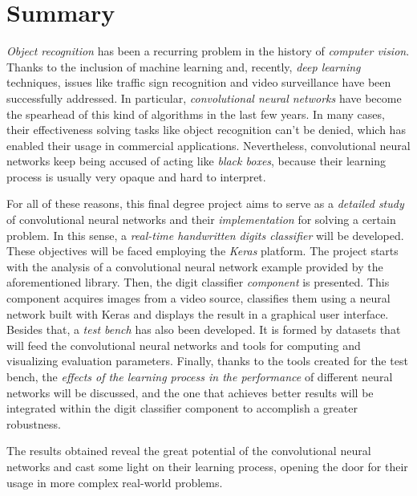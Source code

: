 \chapter*{Summary}
\emph{Object recognition} has been a recurring problem in the history of \emph{computer vision}. Thanks to the inclusion of machine learning and, recently, \emph{deep learning} techniques, issues like traffic sign recognition and video surveillance have been successfully addressed. In particular, \emph{convolutional neural networks} have become the spearhead of this kind of algorithms in the last few years. In many cases, their effectiveness solving tasks like object recognition can't be denied, which has enabled their usage in commercial applications. Nevertheless, convolutional neural networks keep being accused of acting like \emph{black boxes}, because their learning process is usually very opaque and hard to interpret.

For all of these reasons, this final degree project aims to serve as a \emph{detailed study} of convolutional neural networks and their \emph{implementation} for solving a certain problem. In this sense, a \emph{real-time handwritten digits classifier} will be developed. These objectives will be faced employing the \emph{Keras} platform. The project starts with the analysis of a convolutional neural network example provided by the aforementioned library. Then, the digit classifier \emph{component} is presented. This component acquires images from a video source, classifies them using a neural network built with Keras and displays the result in a graphical user interface.  Besides that, a \emph{test bench} has also been developed. It is formed by datasets that will feed the convolutional neural networks and tools for computing and visualizing evaluation parameters. Finally, thanks to the tools created for the test bench, the \emph{effects of the learning process in the performance} of different neural networks will be discussed, and the one that achieves better results will be integrated within the digit classifier component to accomplish a greater robustness.

The results obtained reveal the great potential of the convolutional neural networks and cast some light on their learning process, opening the door for their usage in more complex real-world problems.